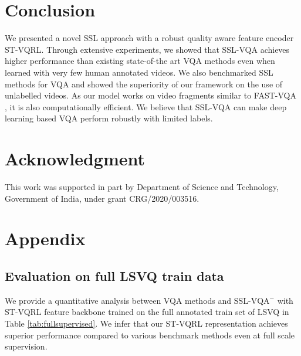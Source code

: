 \documentclass[10pt,twocolumn,letterpaper]{article}
\begin{document}
\section{Conclusion}
We presented a novel SSL approach with a robust quality aware feature encoder ST-VQRL. Through extensive experiments, we showed that SSL-VQA achieves higher performance than existing state-of-the art VQA methods even when learned with very few human annotated videos. We also benchmarked SSL methods for VQA and showed the superiority of our framework on the use of unlabelled videos. As our model works on video fragments similar to FAST-VQA \cite{fastVQA}, it is also computationally efficient. We believe that SSL-VQA can make deep learning based VQA perform robustly with limited labels.

\section*{Acknowledgment}
This work was supported in part by Department of Science
and Technology, Government of India, under grant
CRG/2020/003516.

\section*{Appendix}
\subsection*{Evaluation on full LSVQ train data}
We provide a quantitative analysis between VQA methods
and $\textrm{SSL-VQA}^{-}$ with ST-VQRL feature backbone trained
on the full annotated train set of LSVQ in Table \ref{tab:fullsupervised}. We infer
that our ST-VQRL representation achieves superior performance
compared to various benchmark methods even at full
scale supervision.
\begin{table}[]
\centering
{}
\caption{SROCC performance of various VQA methods}
\label{tab:fullsupervised}
\end{table}
\end{document}
